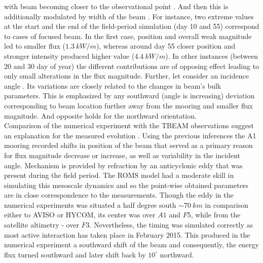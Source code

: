 \documentclass[12pt]{article}
\begin{document}
with beam becoming closer to the observational point . 
And then this is additionally modulated by width of the beam . For instance, two extreme values at the start and the end of the field-period simulation (day 10 and 55) correspond to cases of focused beam. In the first case, position and overall weak magnitude led to smaller 
flux ($1.3~kW/m$), whereas around day 55 closer position and stronger intensity produced higher value 
($4.4~kW/m$). In other instances (between 20 and 30 day of year) the different contributions are of opposing effect leading to only small alterations in the flux magnitude. Further, let 
consider an incidence angle . Its variations are closely related to 
the changes in beam's bulk parameters. This is emphasized by any southward (angle is increasing) 
deviation corresponding to beam location further away from the mooring and smaller flux magnitude. 
And opposite holds for the northward orientation.\\

Comparison of the numerical experiment with the TBEAM observations suggest an explanation for the measured evolution  . Using the previous inferences the A1 mooring recorded shifts in position of the beam that served as a primary reason for flux magnitude decrease or increase, as well as variability in the incident angle. Mechanism is provided by refraction by an anticyclonic eddy that was present during the field period. The ROMS model had a moderate skill in simulating this mesoscale dynamics and so the point-wise obtained parameters are in close correspondence to the measurements. Though the eddy in the numerical 
experiments was situated a half degree south $\sim 70~km$ in comparison either to AVISO or HYCOM, 
its center was over $A1$ and $F5$, while from the satellite altimetry - over $F3$. Nevertheless, 
the timing was simulated correctly as most active interaction has taken place in February 2015. 
This produced in the numerical experiment a southward shift of the beam and consequently, the 
energy flux turned southward  and later shift back by 
$10^\circ$ northward.\\
\end{document}
